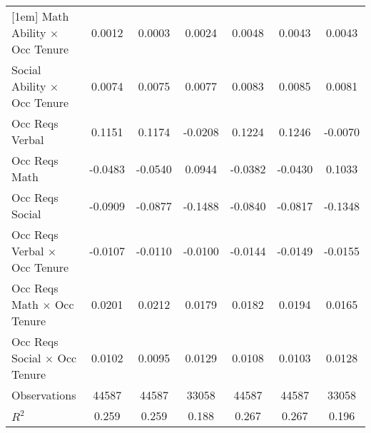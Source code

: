 {\begin{tabular}{l*{6}{c}}
[1em]
Math Ability $\times$ Occ Tenure&      0.0012         &      0.0003         &      0.0024         &      0.0048         &      0.0043         &      0.0043         \\
[1em]
Social Ability $\times$ Occ Tenure&      0.0074\sym{***}&      0.0075\sym{***}&      0.0077\sym{***}&      0.0083\sym{***}&      0.0085\sym{***}&      0.0081\sym{**} \\
[1em]
Occ Reqs Verbal     &      0.1151\sym{*}  &      0.1174\sym{**} &     -0.0208         &      0.1224         &      0.1246         &     -0.0070         \\
[1em]
Occ Reqs Math       &     -0.0483         &     -0.0540         &      0.0944         &     -0.0382         &     -0.0430         &      0.1033         \\
[1em]
Occ Reqs Social     &     -0.0909\sym{***}&     -0.0877\sym{***}&     -0.1488\sym{***}&     -0.0840\sym{**} &     -0.0817\sym{**} &     -0.1348\sym{***}\\
[1em]
Occ Reqs Verbal $\times$ Occ Tenure&     -0.0107\sym{*}  &     -0.0110\sym{*}  &     -0.0100         &     -0.0144         &     -0.0149         &     -0.0155         \\
[1em]
Occ Reqs Math $\times$ Occ Tenure&      0.0201\sym{***}&      0.0212\sym{***}&      0.0179\sym{**} &      0.0182         &      0.0194\sym{*}  &      0.0165         \\
[1em]
Occ Reqs Social $\times$ Occ Tenure&      0.0102\sym{***}&      0.0095\sym{***}&      0.0129\sym{***}&      0.0108\sym{***}&      0.0103\sym{***}&      0.0128\sym{***}\\
\hline  
Observations        &       44587         &       44587         &       33058         &       44587         &       44587         &       33058         \\
\(R^{2}\)           &       0.259         &       0.259         &       0.188         &       0.267         &       0.267         &       0.196         \\
\hline  
\end{tabular}
}
